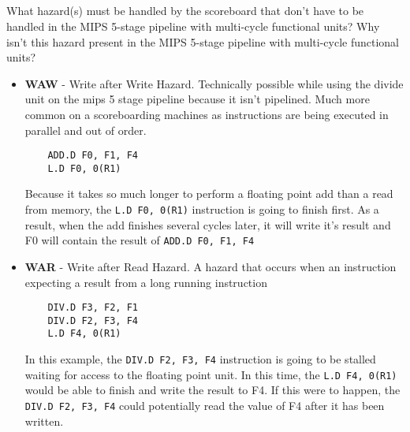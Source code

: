 \documentclass{article}
\begin{document}
\begin{adjustwidth}{2.5em}{0pt}
\subsection{}
What hazard(s) must be handled by the scoreboard that don't have to be handled in the MIPS 5-stage pipeline with multi-cycle functional units? Why isn't this hazard present in the MIPS 5-stage pipeline with multi-cycle functional units?
\vspace{5mm}
\begin{itemize}
\item \textbf{WAW} - Write after Write Hazard. Technically possible while using the divide unit on the mips 5 stage pipeline because it isn't pipelined. Much more common on a scoreboarding machines as instructions are being executed in parallel and out of order. 
\begin{lstlisting}
	ADD.D F0, F1, F4
	L.D F0, 0(R1)
\end{lstlisting}
Because it takes so much longer to perform a floating point add than a read from memory, the \texttt{L.D F0, 0(R1)} instruction is going to finish first. As a result, when the add finishes several cycles later, it will write it's result and F0 will contain the result of \texttt{ADD.D F0, F1, F4}
\item \textbf{WAR} - Write after Read Hazard. A hazard that occurs when an instruction expecting a result from a long running instruction
\begin{lstlisting}
	DIV.D F3, F2, F1
	DIV.D F2, F3, F4
	L.D F4, 0(R1)
\end{lstlisting}
In this example, the \texttt{DIV.D F2, F3, F4} instruction is going to be stalled waiting for access to the floating point unit. In this time, the \texttt{L.D F4, 0(R1)} would be able to finish and write the result to F4. If this were to happen, the \texttt{DIV.D F2, F3, F4} could potentially read the value of F4 after it has been written.
\end{itemize}
\end{adjustwidth}
\end{document}
